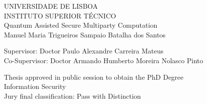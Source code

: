 \begin{center}
\vspace{0.5cm}
{\FontLb UNIVERSIDADE DE LISBOA} \\
\vspace{0.2cm}
{\FontLb INSTITUTO SUPERIOR T\'{E}CNICO} \\


\vspace{5.0cm}
{\FontHb 
Quantum Assisted Secure Multiparty Computation} \\

\vspace{3cm}
{\FontLn Manuel Maria Trigueiros Sampaio Batalha dos Santos} \\
\vspace{2cm}

\end{center}
\begin{flushleft}


{\FontMb Supervisor: \FontMn \qquad Doctor Paulo Alexandre Carreira Mateus} \\
{\FontMb Co-Supervisor: \FontMn \hspace{.0em} Doctor Armando Humberto Moreira Nolasco Pinto} \\

\vspace{2.5cm}

\end{flushleft}
\begin{center}

{\FontMn Thesis approved in public session to obtain the PhD Degree} \\
{\FontMn Information Security} \\
\vspace{1.5cm}
{\FontMb Jury final classification: } Pass with Distinction \\
\vfill
{} \\
%
\end{center}
\thispagestyle{empty}
\cleardoublepage

